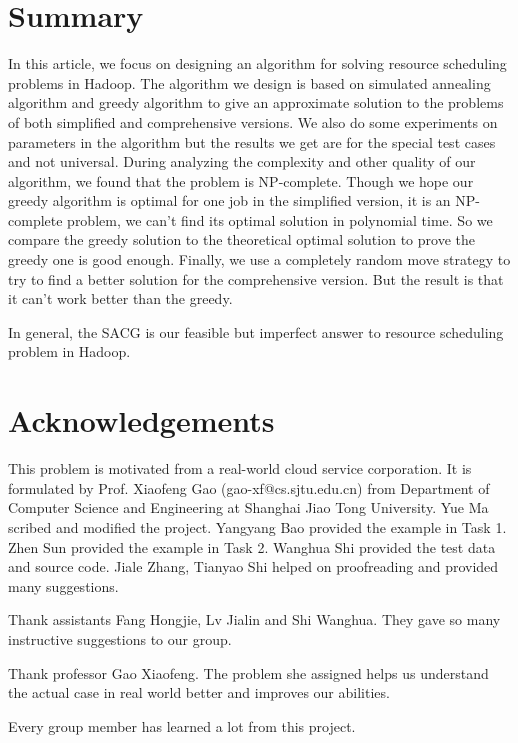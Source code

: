 \documentclass{llncs}
\begin{document}
	\section{Summary}
	In this article, we focus on designing an algorithm for solving resource scheduling problems in Hadoop. The algorithm we design is based on simulated annealing algorithm and greedy algorithm to give an approximate solution to the problems of both simplified and comprehensive versions. We also do some experiments on parameters in the algorithm but the results we get are for the special test cases and not universal. During analyzing the complexity and other quality of our algorithm, we found that the problem is NP-complete. Though we hope our greedy algorithm is optimal for one job in the simplified version, it is an NP-complete problem, we can’t find its optimal solution in polynomial time. So we compare the greedy solution to the theoretical optimal solution to prove the greedy one is good enough. Finally, we use a completely random move strategy to try to find a better solution for the comprehensive version. But the result is that it can’t work better than the greedy. 
	
	In general, the SACG is our feasible but imperfect answer to resource scheduling problem in Hadoop.
	
	\section*{Acknowledgements}
	This problem is motivated from a real-world cloud service corporation. It is formulated by Prof. Xiaofeng Gao (gao-xf@cs.sjtu.edu.cn) from Department of Computer Science and Engineering at Shanghai Jiao Tong University. Yue Ma scribed and modified the project. Yangyang Bao provided the example in Task 1. Zhen Sun provided the example in Task 2. Wanghua Shi provided the test data and source code. Jiale Zhang, Tianyao Shi helped on proofreading and provided many suggestions.
	
	Thank assistants Fang Hongjie, Lv Jialin and Shi Wanghua. They gave so many instructive suggestions to our group.
	
	Thank professor Gao Xiaofeng. The problem she assigned helps us understand the actual case in real world better and improves our abilities. 
	
	Every group member has learned a lot from this project. 
	
\end{document}
